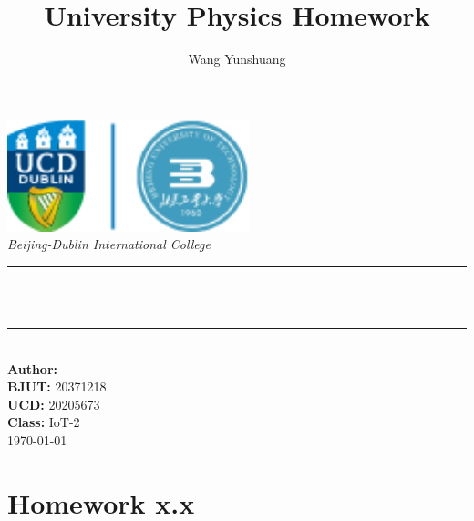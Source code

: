 \documentclass[12pt]{article}
\title{University Physics Homework}
\author{Wang Yunshuang} %
\begin{document}
    
\begin{titlepage} %
    \newcommand{\HRule}{\rule{\linewidth}{0.5mm}}
    \begin{center}
        \includegraphics[width=7cm]{ucdBDIC_logo.png}
        \quad\\[1.5cm]
        \textsl{\Large Beijing-Dublin International College }\\[0.5cm] 
        \makeatletter
        \HRule \\[0.4cm]
	    { \huge \bfseries \@title}\\[0.5cm] 
	    \HRule \\[1.5cm]
		{\large \textbf{Author:} \@author}\\[0.8cm] 
		{\large \textbf{BJUT:} 20371218}\\[0.8cm] %
		{\large \textbf{UCD:} 20205673}\\[0.8cm] %
        {\large \textbf{Class:} IoT-2} \\[5cm] %
	    {\large \today}\\[2cm] 
    \end{center}
\end{titlepage}

\section{Homework x.x}
\subsection{}
\subsection{}
\end{document}
